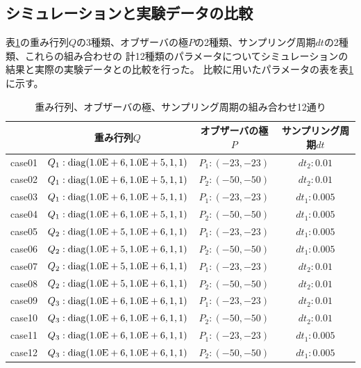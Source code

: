 \documentclass[a4j,11pt,twoside]{ujbook}
\begin{document}
		\subsection{シミュレーションと実験データの比較}
			表\ref{tb:QPTtable}の重み行列$Q$の3種類、オブザーバの極$P$の2種類、サンプリング周期$dt$の2種類、これらの組み合わせの
			計12種類のパラメータについてシミュレーションの結果と実際の実験データとの比較を行った。
			比較に用いたパラメータの表を表\ref{tb:QPTtable}に示す。\\
			\begin{table}[htbp]
				\begin{center}
					\caption{重み行列、オブザーバの極、サンプリング周期の組み合わせ12通り}
					\medskip
					\begin{tabular}{|c|c|c|c|} \hline
						& 重み行列$Q$ & オブザーバの極$P$ & サンプリング周期$dt$ \\ \hline\hline
						case01 &$Q_1:\rm{diag}(1.0E+6,1.0E+5,1,1)$ &$P_1:(-23,-23)$ & ${dt}_2:0.01$ \\\hline
						case02 &$Q_1:\rm{diag}(1.0E+6,1.0E+5,1,1)$ &$P_2:(-50,-50)$ & ${dt}_2:0.01$ \\\hline
						case03 &$Q_1:\rm{diag}(1.0E+6,1.0E+5,1,1)$ &$P_1:(-23,-23)$ & ${dt}_1:0.005$ \\\hline
						case04 &$Q_1:\rm{diag}(1.0E+6,1.0E+5,1,1)$ &$P_2:(-50,-50)$ & ${dt}_1:0.005$ \\\hline
						case05 &$Q_2:\rm{diag}(1.0E+5,1.0E+6,1,1)$ &$P_1:(-23,-23)$ & ${dt}_1:0.005$ \\\hline
						case06 &$Q_2:\rm{diag}(1.0E+5,1.0E+6,1,1)$ &$P_2:(-50,-50)$ & ${dt}_1:0.005$ \\\hline
						case07 &$Q_2:\rm{diag}(1.0E+5,1.0E+6,1,1)$ &$P_1:(-23,-23)$ & ${dt}_2:0.01$  \\\hline
						case08 &$Q_2:\rm{diag}(1.0E+5,1.0E+6,1,1)$ &$P_2:(-50,-50)$ & ${dt}_2:0.01$  \\\hline
						case09 &$Q_3:\rm{diag}(1.0E+6,1.0E+6,1,1)$ &$P_1:(-23,-23)$ & ${dt}_2:0.01$  \\\hline
						case10 &$Q_3:\rm{diag}(1.0E+6,1.0E+6,1,1)$ &$P_2:(-50,-50)$ & ${dt}_2:0.01$  \\\hline
						case11 &$Q_3:\rm{diag}(1.0E+6,1.0E+6,1,1)$ &$P_1:(-23,-23)$ & ${dt}_1:0.005$  \\\hline
						case12 &$Q_3:\rm{diag}(1.0E+6,1.0E+6,1,1)$ &$P_2:(-50,-50)$ & ${dt}_1:0.005$  \\\hline
					\end{tabular}
					\label{tb:QPTtable}
				\end{center}
			\end{table}
		
\end{document}
